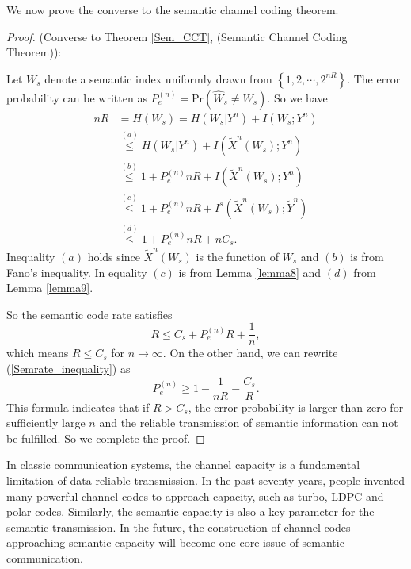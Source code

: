 \documentclass[12pt, draftclsnofoot,onecolumn]{IEEEtran}
\begin{document}
We now prove the converse to the semantic channel coding theorem.
\begin{proof} (Converse to Theorem \ref{Sem_CCT}, (Semantic Channel Coding Theorem)):

Let $W_s$ denote a semantic index uniformly drawn from $\left\{1,2,\cdots,2^{nR}\right\}$. The error probability can be written as $P_e^{(n)}=\text{Pr}(\hat{W}_s\neq W_s)$. So we have
\begin{equation}
\begin{aligned}
nR&=H(W_s)=H(W_s|Y^n)+I(W_s;Y^n)   \\
    &\overset{(a)}{\leq} H(W_s|Y^n)+I(\tilde{X}^n(W_s);Y^n)  \\
    &\overset{(b)}{\leq} 1+P_e^{(n)} nR +I(\tilde{X}^n(W_s);Y^n) \\
    &\overset{(c)}{\leq} 1+P_e^{(n)} nR +I^s(\tilde{X}^n(W_s);\tilde{Y}^n) \\
    &\overset{(d)}{\leq} 1+P_e^{(n)} nR +nC_s.
\end{aligned}
\end{equation}
Inequality $(a)$ holds since $\tilde{X}^n(W_s)$ is the function of $W_s$ and $(b)$ is from Fano's inequality. In equality $(c)$ is from Lemma \ref{lemma8} and $(d)$ from Lemma \ref{lemma9}.

So the semantic code rate satisfies
\begin{equation}\label{Semrate_inequality}
R\leq C_s+P_e^{(n)} R+\frac{1}{n},
\end{equation}
which means $R\leq C_s$ for $n\to\infty$.
On the other hand, we can rewrite (\ref{Semrate_inequality}) as
\begin{equation}
P_e^{(n)}\geq 1-\frac{1}{nR}-\frac{C_s}{R}.
\end{equation}
This formula indicates that if $R>C_s$, the error probability is larger than zero for sufficiently large $n$ and the reliable transmission of semantic information can not be fulfilled. So we complete the proof.
\end{proof}

In classic communication systems, the channel capacity is a fundamental limitation of data reliable transmission. In the past seventy years, people invented many powerful channel codes to approach capacity, such as turbo, LDPC and polar codes. Similarly, the semantic capacity is also a key parameter for the semantic transmission. In the future, the construction of channel codes approaching semantic capacity will become one core issue of semantic communication.
\end{document}
